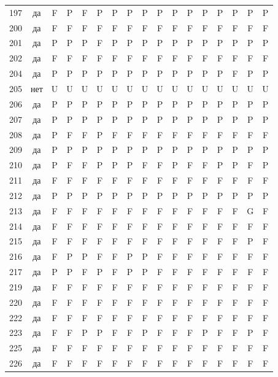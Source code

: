 \begin{table}[p]
\begin{tabular*}{\textwidth}{@{\extracolsep{\fill}}rcccccccccccccccc}
197 & да & F & P & F & P & P & P & P & P & P & P & P & P & P & P & P\\
200 & да & F & F & F & F & F & F & F & F & F & F & F & F & F & F & F\\
201 & да & P & P & P & F & P & P & P & P & P & P & P & P & P & P & P\\
202 & да & F & F & F & F & F & F & F & F & F & F & F & F & F & F & F\\
204 & да & P & P & P & P & P & P & P & P & P & P & P & P & F & P & P\\
205 & нет & U & U & U & U & U & U & U & U & U & U & U & U & U & U & U\\
206 & да & P & P & P & P & P & P & P & P & P & P & P & P & P & P & P\\
207 & да & P & P & P & P & P & P & P & P & P & P & P & P & P & P & P\\
208 & да & P & F & F & P & F & F & F & F & F & F & F & F & F & F & F\\
209 & да & P & P & P & P & P & P & P & P & P & P & P & P & P & P & P\\
210 & да & P & F & F & P & P & P & F & F & P & F & F & P & P & F & P\\
211 & да & F & F & F & F & F & F & F & F & F & F & F & F & F & F & F\\
212 & да & P & P & P & P & P & P & P & P & P & P & P & P & P & P & P\\
213 & да & F & F & F & F & F & F & F & F & F & F & F & F & F & G & F\\
214 & да & F & F & F & F & F & F & F & F & F & F & F & F & F & F & F\\
215 & да & F & F & F & F & F & F & F & F & F & F & F & F & F & P & F\\
216 & да & F & P & P & F & F & P & P & F & F & F & F & F & F & F & F\\
217 & да & P & P & F & P & F & P & P & F & F & F & F & F & F & F & F\\
219 & да & F & F & F & F & F & F & F & F & F & F & F & F & F & F & F\\
220 & да & F & F & F & F & F & F & F & F & F & F & F & F & F & F & F\\
222 & да & F & F & F & F & F & F & F & F & F & F & F & F & F & F & F\\
223 & да & F & F & P & P & F & F & P & F & F & F & P & F & F & P & F\\
225 & да & F & F & F & F & F & F & F & F & F & F & F & F & F & F & F\\
226 & да & F & F & F & F & F & F & F & F & F & F & F & F & F & F & F\\
\bottomrule\end{tabular*}\end{table}
\clearpage

